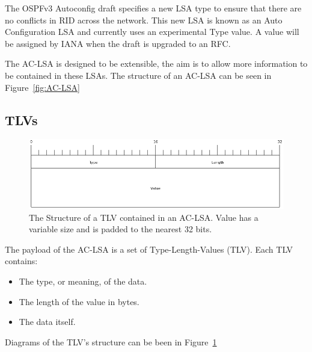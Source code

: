 \documentclass[12pt,a4paper,twoside]{report}
\begin{document}
The OSPFv3 Autoconfig draft specifies a new LSA type to ensure that
there are no conflicts in RID across the network. This new LSA is known
as an Auto Configuration LSA and currently uses an experimental Type value. A
value will be assigned by IANA when the draft is upgraded to an RFC. 

The AC-LSA is designed to be extensible, the aim is to allow more information
to be contained in these LSAs. The structure of an AC-LSA can be seen in
Figure~\ref{fig:AC-LSA} 

\subsection{TLVs}
\begin{figure}
\begin{center}
	\includegraphics[width=\linewidth]{../Diagrams/Packets/tlv.png}
	\caption{The Structure of a TLV contained in an AC-LSA. Value has a variable
	size and is padded to the nearest 32 bits.}\label{fig:TLV}
\end{center}
\end{figure}

The payload of the AC-LSA is a set of Type-Length-Values (TLV). Each TLV
contains: 
\begin{itemize}
    \item The type, or meaning, of the data.
    \item The length of the value in bytes.
    \item The data itself.
  \end{itemize}

Diagrams of the TLV's structure can be been in Figure~\ref{fig:TLV}
\end{document}
